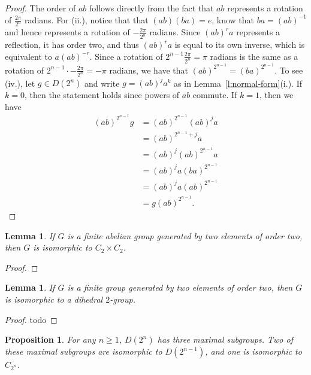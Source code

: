 \documentclass{amsart}
\numberwithin{equation} {section}
\newtheorem{lemma}[equation]{Lemma}
\newtheorem{proposition}[equation]{Proposition}
\theoremstyle{definition}
\begin{document}
\begin{proof}
The order of $ab$ follows directly from the fact that $ab$ represents a rotation of $\displaystyle\frac{2\pi}{2^n}$ radians.  For (ii.), notice that that $(ab)(ba) = e$, know that $ba = (ab)^{-1}$ and hence represents a rotation of  $-\displaystyle\frac{2\pi}{2^n}$ radians. Since $(ab)^r a$ represents a reflection, it has order two, and thus $(ab)^r a$ is equal to its own inverse, which is equivalent to $a (ab)^{-r}$. Since a rotation of $2^{n-1} \displaystyle\frac{2\pi}{2^n} = \pi$ radians is the same as a rotation of $ 2^{n-1} \cdot -\displaystyle\frac{2\pi}{2^n} = -\pi$ radians, we have that $(ab)^{2^{n-1}} = (ba)^{2^{n-1}}$. To see (iv.), let $g \in D(2^n)$ and write $g = (ab)^ja^k$ as in Lemma~\ref{l:normal-form}(i.). If $k = 0$, then the statement holds since powers of $ab$ commute. If $k = 1$, then we have 
\begin{align*}
(ab)^{2^{n-1}} g &= (ab)^{2^{n-1}} (ab)^j a \\
&= (ab)^{2^{n-1} +j} a \\
&= (ab)^j (ab)^{2^{n-1}} a  \\
&= (ab)^j a (ba)^{2^{n-1}} \\
&= (ab)^j a (ab)^{2^{n-1}} \\
&= g (ab)^{2^{n-1}}. 
\end{align*}
\end{proof}

\begin{lemma}\label{l:C2-C2-structure-lemma}
If $G$ is a finite abelian group generated by two elements of order two, then $G$ is isomorphic to $C_2 \times C_2$. 
\end{lemma}

\begin{proof}
 
\end{proof}

\begin{lemma}\label{l:dihedral-structure-lemma}
If $G$ is a finite group generated by two elements of order two, then $G$ is isomorphic to a dihedral $2$-group. 
\end{lemma}

\begin{proof}
todo
\end{proof}

\begin{proposition}\label{p:dihedral-maximal-subgroups}
For any $n \geq 1$, $D(2^n)$ has three maximal subgroups. Two of these maximal subgroups are isomorphic to $D(2^{n-1})$, and one is isomorphic to $C_{2^n}$.
\end{proposition}
\end{document}
